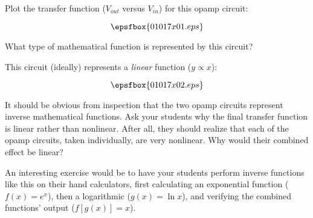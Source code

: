 

Plot the transfer function ($V_{out}$ versus $V_{in}$) for this opamp circuit:

$$\epsfbox{01017x01.eps}$$

What type of mathematical function is represented by this circuit?







This circuit (ideally) represents a {\it linear} function ($y \propto x$):

$$\epsfbox{01017x02.eps}$$







It should be obvious from inspection that the two opamp circuits represent inverse mathematical functions.  Ask your students why the final transfer function is linear rather than nonlinear.  After all, they should realize that each of the opamp circuits, taken individually, are very nonlinear.  Why would their combined effect be linear?

An interesting exercise would be to have your students perform inverse functions like this on their hand calculators, first calculating an exponential function ($f(x) = e^x$), then a logarithmic ($g(x) = \ln x$), and verifying the combined functions' output ($f[g(x)] = x$).




